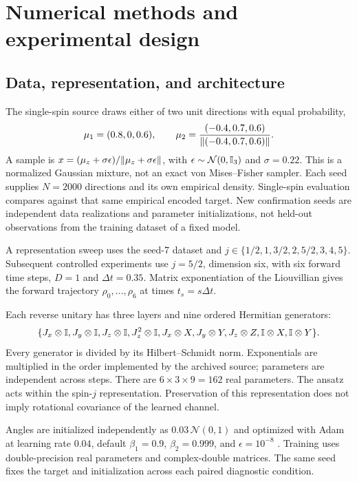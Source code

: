 \section{Numerical methods and experimental design}
\subsection{Data, representation, and architecture}
The single-spin source draws either of two unit directions with equal probability,
\begin{equation}
 \mu_1=(0.8,0,0.6),\qquad
 \mu_2=\frac{(-0.4,0.7,0.6)}{\lVert (-0.4,0.7,0.6)\rVert}.
\end{equation}
A sample is $x=(\mu_z+\sigma\epsilon)/\lVert \mu_z+\sigma\epsilon\rVert$, with $\epsilon\sim\mathcal N(0,\mathbb{I}_3)$ and $\sigma=0.22$. This is a normalized Gaussian mixture, not an exact von Mises--Fisher sampler. Each seed supplies $N=2000$ directions and its own empirical density. Single-spin evaluation compares against that same empirical encoded target. New confirmation seeds are independent data realizations and parameter initializations, not held-out observations from the training dataset of a fixed model.

A representation sweep uses the seed-7 dataset and $j\in\{1/2,1,3/2,2,5/2,3,4,5\}$. Subsequent controlled experiments use $j=5/2$, dimension six, with six forward time steps, $D=1$ and $\Delta t=0.35$. Matrix exponentiation of the Liouvillian gives the forward trajectory $\rho_0,\ldots,\rho_6$ at times $t_s=s\Delta t$.

Each reverse unitary has three layers and nine ordered Hermitian generators:
\begin{equation}
 \{J_x\otimes\mathbb{I},J_y\otimes\mathbb{I},J_z\otimes\mathbb{I},J_z^2\otimes\mathbb{I},
 J_x\otimes X,J_y\otimes Y,J_z\otimes Z,\mathbb{I}\otimes X,\mathbb{I}\otimes Y\}.
 \label{eq:generators}
\end{equation}
Every generator is divided by its Hilbert--Schmidt norm. Exponentials are multiplied in the order implemented by the archived source; parameters are independent across steps. There are $6\times3\times9=162$ real parameters. The ansatz acts within the spin-$j$ representation. Preservation of this representation does not imply rotational covariance of the learned channel.

Angles are initialized independently as $0.03\,\mathcal N(0,1)$ and optimized with Adam at learning rate $0.04$, default $\beta_1=0.9$, $\beta_2=0.999$, and $\epsilon=10^{-8}$ \citep{kingma2015}. Training uses double-precision real parameters and complex-double matrices. The same seed fixes the target and initialization across each paired diagnostic condition.

